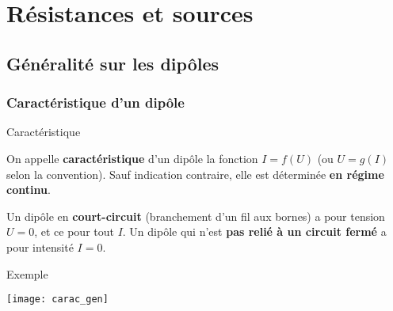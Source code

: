 \documentclass[../main/main.tex]{subfiles}
\begin{document}
\setcounter{chapter}{1}

\chapter{R\'esistances et sources}

\section{Généralité sur les dipôles}
\subsection{Caractéristique d'un dipôle}
\begin{tcbraster}[raster columns=2, raster equal height=rows]
    \begin{defi}[label=def:dipcara]{Caractéristique}

        On appelle \textbf{caractéristique} d'un dipôle la fonction $I = f(U)$
        (ou $U = g(I)$ selon la convention). Sauf indication contraire, elle est
        déterminée \textbf{en régime continu}.


        Un dipôle en \textbf{court-circuit} (branchement d'un fil aux bornes) a
        pour tension $U = 0$, et ce pour tout $I$. Un dipôle qui n'est
        \textbf{pas relié à un circuit fermé} a pour intensité $I = 0$.
    \end{defi}
    \begin{exem}[label=exem:dipcara]{Exemple}
        \begin{center}
            \texttt{[image: carac\_gen]}
        \end{center}
    \end{exem}
\end{tcbraster}
\end{document}
